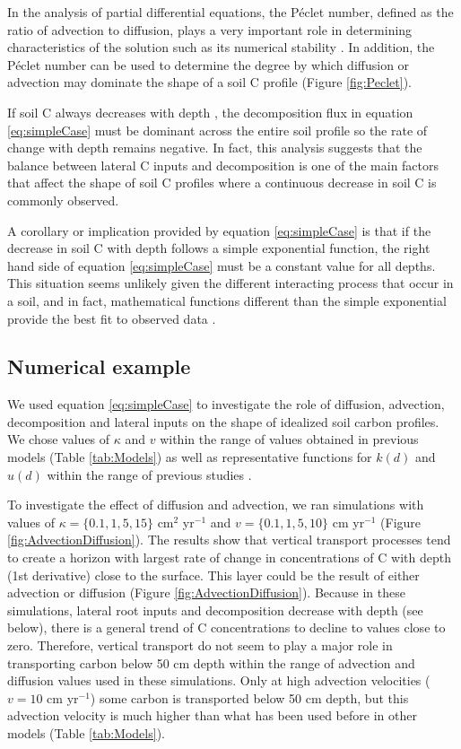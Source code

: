 \documentclass[11pt, oneside, a4paper]{article}   	%
\begin{document}
In the analysis of partial differential equations, the Péclet number, defined as the ratio of advection to diffusion, plays a very important role in determining characteristics of the solution such as its numerical stability \citep{LeVeque2007}. In addition, the Péclet number can be used to determine the degree by which diffusion or advection may dominate the shape of a soil C profile (Figure \ref{fig:Peclet}). 

If soil C always decreases with depth \citep{Jobbagy2000}, the decomposition flux in equation \ref{eq:simpleCase} must be dominant across the entire soil profile so the rate of change with depth remains negative. In fact, this analysis suggests that the balance between lateral C inputs and decomposition is one of the main factors that affect the shape of soil C profiles where a continuous decrease in soil C is commonly observed. 

A corollary or implication provided by equation \ref{eq:simpleCase} is that if the decrease in soil C with depth follows a simple exponential function, the right hand side of equation \ref{eq:simpleCase} must be a constant value for all depths. This situation seems unlikely given the different interacting process that occur in a soil, and in fact, mathematical functions different than the simple exponential provide the best fit to observed data \citep{Jobbagy2000}.

\subsection{Numerical example} \label{sec:ex1}
We used equation \ref{eq:simpleCase} to investigate the role of diffusion, advection, decomposition and lateral inputs on the shape of idealized soil carbon profiles. 
We chose values of $\kappa$ and $v$ within the range of values obtained in previous models (Table \ref{tab:Models}) as well as representative functions for $k(d)$ and $u(d)$ within the range of previous studies \citep[e.g.][]{Elzein1995, Jackson1996, Jackson1997,Koven2013BGS}.

To investigate the effect of diffusion and advection, we ran simulations with values of $\kappa = \{0.1, 1, 5, 15\}$ cm$^2$ yr$^{-1}$ and $v = \{0.1, 1, 5, 10 \}$ cm yr$^{-1}$ (Figure \ref{fig:AdvectionDiffusion}). The results show that vertical transport processes tend to create a horizon with largest rate of change in concentrations of C with depth (1st derivative) close to the surface. This layer could be the result of either advection or diffusion (Figure \ref{fig:AdvectionDiffusion}). Because in these simulations, lateral root inputs and decomposition decrease with depth (see below), there is a general trend of C concentrations to decline to values close to zero. Therefore, vertical transport do not seem to play a major role in transporting carbon below 50 cm depth within the range of advection and diffusion values used in these simulations. Only at high advection velocities ($v=10$ cm yr$^{-1}$) some carbon is transported below 50 cm depth, but this advection velocity is much higher than what has been used before in other models (Table \ref{tab:Models}).
\end{document}
